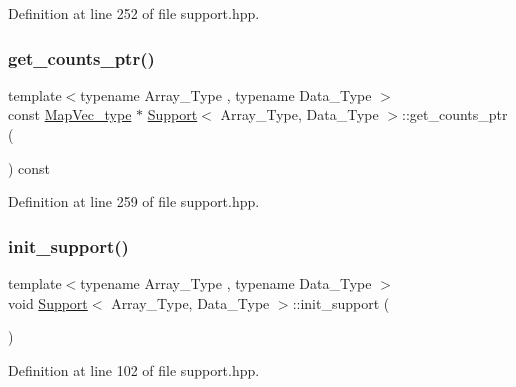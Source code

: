 Definition at line 252 of file support.\+hpp.

\mbox{\label{class_support_a170776abc15d0fa8e02df36268e900a7}} 
\subsubsection{\texorpdfstring{get\+\_\+counts\+\_\+ptr()}{get\_counts\_ptr()}}
{\footnotesize\ttfamily template$<$typename Array\+\_\+\+Type , typename Data\+\_\+\+Type $>$ \\
const \hyperlink{typedefs_8hpp_a02ed8dec96bc528c8bc3d8cb3c4674a5}{Map\+Vec\+\_\+type} $\ast$ \hyperlink{class_support}{Support}$<$ Array\+\_\+\+Type, Data\+\_\+\+Type $>$\+::get\+\_\+counts\+\_\+ptr (\begin{DoxyParamCaption}{ }\end{DoxyParamCaption}) const\hspace{0.3cm}{\ttfamily [inline]}}



Definition at line 259 of file support.\+hpp.

\mbox{\label{class_support_aef6fda6e7a0989f53fcd252609d770c9}} 
\subsubsection{\texorpdfstring{init\+\_\+support()}{init\_support()}}
{\footnotesize\ttfamily template$<$typename Array\+\_\+\+Type , typename Data\+\_\+\+Type $>$ \\
void \hyperlink{class_support}{Support}$<$ Array\+\_\+\+Type, Data\+\_\+\+Type $>$\+::init\+\_\+support (\begin{DoxyParamCaption}{ }\end{DoxyParamCaption})\hspace{0.3cm}{\ttfamily [inline]}}



Definition at line 102 of file support.\+hpp.

\mbox{\label{class_support_a5878ac60282fc1380c92f3ba502f249e}} 

